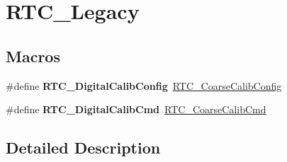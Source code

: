 \hypertarget{group___r_t_c___legacy}{}\section{R\+T\+C\+\_\+\+Legacy}
\label{group___r_t_c___legacy}
\subsection*{Macros}
\begin{DoxyCompactItemize}
\item 
\hypertarget{group___r_t_c___legacy_ga6fd6ce83a6c888a7613e641d4478c0cc}{}\#define {\bfseries R\+T\+C\+\_\+\+Digital\+Calib\+Config}~\hyperlink{group___r_t_c_gaa3bb10170a2c70ac9ce3e41c611bdd43}{R\+T\+C\+\_\+\+Coarse\+Calib\+Config}\label{group___r_t_c___legacy_ga6fd6ce83a6c888a7613e641d4478c0cc}

\item 
\hypertarget{group___r_t_c___legacy_ga8a04a24beeae55e24cf8d2f3dbb5ead5}{}\#define {\bfseries R\+T\+C\+\_\+\+Digital\+Calib\+Cmd}~\hyperlink{group___r_t_c_ga008ae7173b2befe876f5e76686bc9089}{R\+T\+C\+\_\+\+Coarse\+Calib\+Cmd}\label{group___r_t_c___legacy_ga8a04a24beeae55e24cf8d2f3dbb5ead5}

\end{DoxyCompactItemize}


\subsection{Detailed Description}
